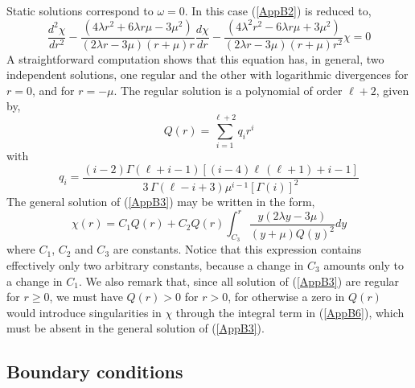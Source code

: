 \documentclass[12pt,aps,floats,showpacs,amssymb,tightenlines]{revtex4}
\begin{document}
Static solutions correspond to  $\omega=0$. In this case (\ref{AppB2}) is
reduced to,
\begin{equation}
\label{AppB3}
{\frac {d^2 \chi}{d{r}^{2}}}
 -{\frac { \left(
4 \lambda {r}^{2}+6  \lambda r\mu -3{\mu}^{2} \right)  }{
 \left( 2  \lambda  r-3\mu \right)  \left( r+\mu
 \right) r}}{\frac {d \chi}{dr}} -{\frac { \left( 4{\lambda}^{2}{r}^{2}-6
\lambda  r\mu+3{\mu}^{2} \right)
  }{ \left( 2  \lambda  r-3\mu \right)
 \left( r+\mu \right) {r}^{2}}}{\chi} =0
\end{equation}
A straightforward computation shows that this equation has, in general, two independent solutions, one
regular and the other with logarithmic divergences for $r=0$, and
for $r=-\mu$.  The regular
solution is a polynomial of order $\ell+2$, given by,
\begin{equation}
\label{AppB4}
 Q(r)=\sum_{i=1}^{\ell +2} q_i r^i
\end{equation}
with
\begin{equation}
\label{AppB5}
  q_{{i}}={\frac { \left( i-2 \right) \Gamma  \left( {\ell}+i-1 \right)  \left[  \left( i-4 \right)
   {\ell}\, \left( {\ell}
+1 \right) +i-1 \right] } { 3\, \Gamma( {\ell}-i+3) {\mu}^{i -1}
\left[ \Gamma( i )  \right] ^{2}}}
\end{equation}
The general solution of (\ref{AppB3}) may
be written in the form,
\begin{equation}
\label{AppB6}
\chi(r) = C_1 Q(r) + C_2 Q(r) \int_{C_3}^r{\frac{y (2
\lambda y -3 \mu)}{(y+\mu)Q(y)^2} dy}
\end{equation}
where $C_1$, $C_2$ and $C_3$ are constants. Notice that this
expression contains effectively only two arbitrary constants,
because a change in $C_3$ amounts only to a change in $C_1$. We also remark that, since all solution
of (\ref{AppB3}) are regular for $r \geq 0$, we must have $Q(r) > 0$ for $r>0$, for otherwise a zero
 in $Q(r)$ would introduce singularities in $\chi$ through the integral term in (\ref{AppB6}), which must be absent in the general solution of (\ref{AppB3}).

\subsection{Boundary conditions}
\end{document}
